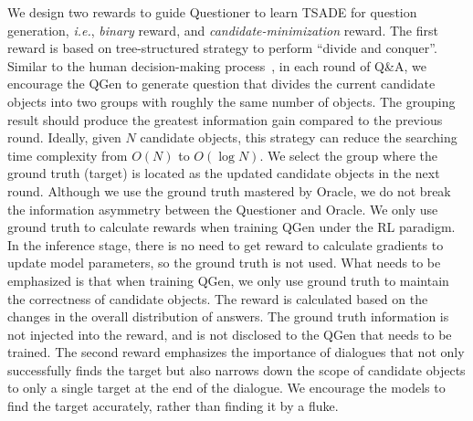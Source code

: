We design two rewards to guide Questioner to learn TSADE for question generation, {\it i.e.}, \emph{binary} reward, and \emph{candidate-minimization} reward. The first reward is based on tree-structured strategy to perform ``divide and conquer''. Similar to the human decision-making process~\cite{stenning2012human}, in each round of Q\&A, we encourage the QGen to generate question that divides the current candidate objects into two groups with roughly the same number of objects. The grouping result should produce the greatest information gain compared to the previous round.  
Ideally, given $N$ candidate objects, this strategy can reduce the searching time complexity from $O(N)$ to $O(\log N)$.
We select the group where the ground truth (target) is located as the updated candidate objects in the next round. Although we use the ground truth mastered by Oracle, we do not break the information asymmetry between the Questioner and Oracle. We only use ground truth to calculate rewards when training QGen under the RL paradigm. In the inference stage, there is no need to get reward to calculate gradients to update model parameters, so the ground truth is not used. What needs to be emphasized is that when training QGen, we only use ground truth to maintain the correctness of candidate objects. The reward is calculated based on the changes in the overall distribution of answers. The ground truth information is not injected into the reward, and is not disclosed to the QGen that needs to be trained.
The second reward emphasizes the importance of dialogues that not only successfully finds the target but also narrows down the scope of candidate objects to only a single target at the end of the dialogue.
We encourage the models to find the target accurately, rather than finding it by a fluke.


